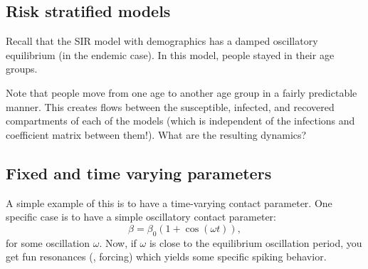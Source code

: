 \documentclass[12pt]{article}
\begin{document}
\subsection{Risk stratified models}
Recall that the SIR model with demographics has a damped oscillatory equilibrium (in the endemic case). In this model, people stayed in their age groups.

Note that people move from one age to another age group in a fairly predictable manner. This creates flows between the susceptible, infected, and recovered compartments of each of the models (which is independent of the infections and coefficient matrix between them!). What are the resulting dynamics?

\subsection{Fixed and time varying parameters}
A simple example of this is to have a time-varying contact parameter. One specific case is to have a simple oscillatory contact parameter:
\[
\beta = \beta_0(1 + \cos(\omega t)),
\]
for some oscillation $\omega$. Now, if $\omega$ is close to the equilibrium oscillation period, you get fun resonances (\eg, forcing) which yields some specific spiking behavior.
\end{document}
